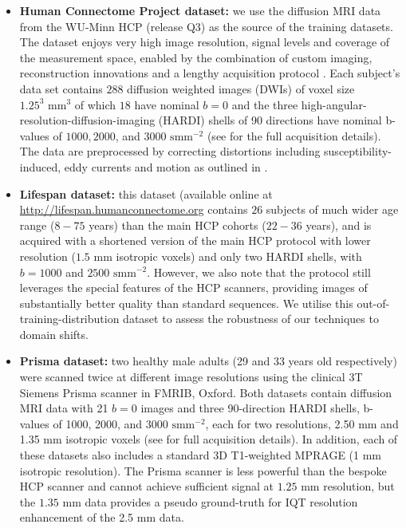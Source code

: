 \begin{itemize}
	\item \textbf{Human Connectome Project dataset: } we use the diffusion MRI data from the WU-Minn HCP (release Q3) \cite{van2013wu} as the source of the training datasets. The dataset enjoys very high image resolution, signal levels and coverage of the measurement space, enabled by the combination of custom imaging, reconstruction innovations and a lengthy acquisition protocol \cite{sotiropoulos2013advances}. Each subject's data set contains $288$ diffusion weighted images (DWIs) of voxel size $1.25^{3} \text{ mm}^{3}$ of which $18$ have nominal $b=0$ and the three high-angular-resolution-diffusion-imaging (HARDI) shells of 90 directions have nominal b-values of $1000, 2000$, and $3000 \text{ smm}^{-2}$ (see \cite{sotiropoulos2013advances} for the full acquisition details). The data are preprocessed by correcting distortions including susceptibility-induced, eddy currents and motion as outlined in \cite{glasser2013minimal}.
	
	\item \textbf{Lifespan dataset:} this dataset (available online at \url{http://lifespan.humanconnectome.org} contains $26$ subjects of much wider age range ($8-75$ years) than the main HCP cohorts ($22-36$ years), and is acquired with a shortened version of the main HCP protocol with lower resolution ($1.5$ mm isotropic voxels) and only two HARDI shells, with $b = 1000$ and $2500 \text{ smm}^{-2}$. However, we also note that the protocol still leverages the special features of the HCP scanners, providing images of substantially better quality than standard sequences. We utilise this out-of-training-distribution dataset  to assess the robustness of our techniques to domain shifts. 
	 
	\item \textbf{Prisma dataset:} two healthy male adults (29 and 33 years old respectively) were scanned twice at different image resolutions using the clinical 3T Siemens Prisma scanner in FMRIB, Oxford. Both datasets contain diffusion MRI data with 21 $b=0$ images and three 90-direction HARDI shells, b-values of 1000, 2000, and $3000 \text{ smm}^{-2}$, each for two resolutions, 2.50 mm and 1.35 mm isotropic voxels  (see \cite{alexander2017image} for full acquisition details). In addition, each of these datasets also includes a standard 3D T1-weighted MPRAGE (1 mm isotropic resolution). The Prisma scanner is less powerful than the bespoke HCP scanner and cannot achieve sufficient signal at $1.25$ mm resolution, but the $1.35$ mm data provides a pseudo ground-truth for IQT resolution enhancement of the 2.5 mm data. 
	

\end{itemize}
